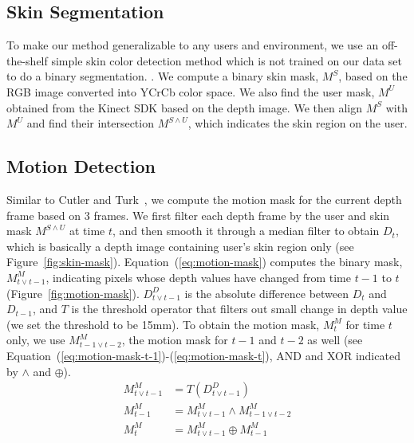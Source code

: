 \documentclass{sigchi}
\begin{document}
\subsection{Skin Segmentation}
To make our method generalizable to any users and environment, we use an off-the-shelf simple skin color detection method which is not trained on our data set to do a binary segmentation. 
. We compute a binary skin mask, $M^S$, based on the RGB image converted into YCrCb
color space.  We also find the user mask, $M^U$ obtained from the Kinect SDK based on the depth image. 
We then align $M^S$ with $M^U$ and find their intersection $M^{S\wedge U}$, which indicates the skin region on the user.

\subsection{Motion Detection}
Similar to Cutler and Turk~\cite{cutler1998}, we compute the motion mask for the current depth frame based on 3 frames. We first filter each 
depth frame by the user and skin mask $M^{S\wedge U}$ at time $t$, and then
smooth it through a median filter to obtain $D_t$, which is basically a depth image containing user's skin region only (see Figure~\ref{fig:skin-mask}).
Equation~(\ref{eq:motion-mask}) computes the binary mask, $M_{t\vee t-1}^M$, indicating pixels whose depth values have changed from time $t-1$ to $t$ (Figure~\ref{fig:motion-mask}).
$D_{t\vee t-1}^{D}$ is the absolute difference between $D_t$ and $D_{t-1}$, and $T$ is the threshold operator that filters out small change in depth value 
(we set the threshold to be 15mm). 
To obtain the motion mask, $M_{t}^M$ for time $t$ only, we use $M_{t-1\vee t-2}^M$, the motion mask for $t-1$ and $t-2$ as well (see Equation~(\ref{eq:motion-mask-t-1})-(\ref{eq:motion-mask-t}),
 AND and XOR indicated by $\wedge$ and $\oplus$).
\begin{align}
M_{t\vee t-1}^M &= T(D_{t\vee t-1}^{D}) \label{eq:motion-mask} \\
M_{t-1}^M &= M_{t\vee t-1}^M \wedge M_{t-1\vee t-2}^M \label{eq:motion-mask-t-1}\\
M_{t}^M &= M_{t\vee t-1}^M \oplus M_{t-1}^M \label{eq:motion-mask-t}
\end{align}
\end{document}
